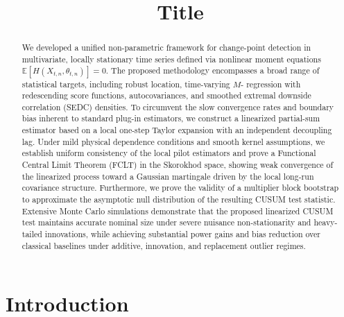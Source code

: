 \documentclass[10pt, a4paper]{article}
\title{\textbf{Title}}
\author[]{}
\date{} %
\theoremstyle{assumption}
\theoremstyle{definition}
\theoremstyle{theorem}
\begin{document}
\maketitle

\begin{abstract}
    We developed a unified non-parametric framework for change-point detection in multivariate, locally 
stationary time series defined via nonlinear moment equations $\mathbb{E}[H(X_{t,n}, \theta_{t,n})] = 0$. The proposed 
methodology encompasses a broad range of statistical targets, including robust location, time-varying $M$-
regression with redescending score functions, autocovariances, and smoothed extremal downside 
correlation (SEDC) densities. To circumvent the slow convergence rates and boundary bias inherent to 
standard plug-in estimators, we construct a linearized partial-sum estimator based on a local one-step Taylor 
expansion with an independent decoupling lag. Under mild physical dependence conditions and smooth 
kernel assumptions, we establish uniform consistency of the local pilot estimators and prove a Functional 
Central Limit Theorem (FCLT) in the Skorokhod space, showing weak convergence of the linearized process 
toward a Gaussian martingale driven by the local long-run covariance structure. Furthermore, we prove the 
validity of a multiplier block bootstrap to approximate the asymptotic null distribution of the resulting 
CUSUM test statistic. Extensive Monte Carlo simulations demonstrate that the proposed linearized CUSUM 
test maintains accurate nominal size under severe nuisance non-stationarity and heavy-tailed innovations, 
while achieving substantial power gains and bias reduction over classical baselines under additive, 
innovation, and replacement outlier regimes.

\end{abstract}

\section{Introduction}
\end{document}
